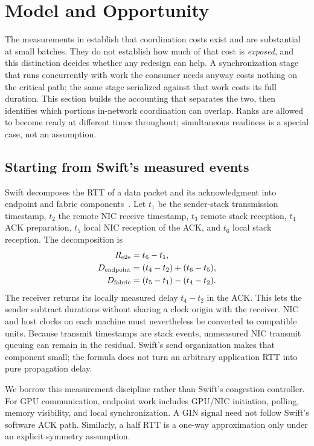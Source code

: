 \section{Model and Opportunity}
\label{sec:model}
The measurements in  establish that coordination costs exist and
are substantial at small batches. They do not establish how much of that cost is
\emph{exposed}, and this distinction decides whether any redesign can help. A
synchronization stage that runs concurrently with work the consumer needs anyway costs
nothing on the critical path; the same stage serialized against that work costs its
full duration. This section builds the accounting that separates the two, then
identifies which portions in-network coordination can overlap. Ranks are allowed to
become ready at different times throughout; simultaneous readiness is a special case,
not an assumption.

\subsection{Starting from Swift's measured events}
Swift decomposes the RTT of a data packet and its acknowledgment into endpoint and fabric components~\cite{swift}. Let $t_1$ be the sender-stack transmission timestamp, $t_2$ the remote NIC receive timestamp, $t_3$ remote stack reception, $t_4$ ACK preparation, $t_5$ local NIC reception of the ACK, and $t_6$ local stack reception. The decomposition is
\begin{align}
 R_{\rm e2e} &= t_6-t_1,\\
 D_{\rm endpoint} &= (t_4-t_2)+(t_6-t_5),\\
 D_{\rm fabric} &= (t_5-t_1)-(t_4-t_2).
 \label{eq:swift}
\end{align}
The receiver returns its locally measured delay $t_4-t_2$ in the ACK. This lets the sender subtract durations without sharing a clock origin with the receiver. NIC and host clocks on each machine must nevertheless be converted to compatible units. Because transmit timestamps are stack events, unmeasured NIC transmit queuing can remain in the residual. Swift's send organization makes that component small; the formula does not turn an arbitrary application RTT into pure propagation delay.

We borrow this measurement discipline rather than Swift's congestion controller. For GPU communication, endpoint work includes GPU/NIC initiation, polling, memory visibility, and local synchronization. A GIN signal need not follow Swift's software ACK path. Similarly, a half RTT is a one-way approximation only under an explicit symmetry assumption.

